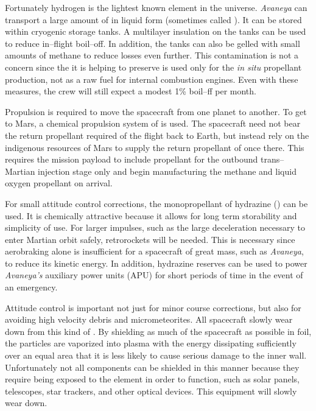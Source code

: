 Fortunately hydrogen is the lightest known element in the universe. {\it Avaneya} can transport a large amount of  in liquid form (sometimes called ). It can be stored within cryogenic storage tanks. A multilayer insulation on the tanks can be used to reduce in--flight boil--off. In addition, the tanks can also be gelled with small amounts of methane to reduce losses even further. This  contamination is not a concern since the  it is helping to preserve is used only for the {\it in situ} propellant production, not as a raw fuel for internal combustion engines. Even with these measures, the crew will still expect a modest 1\% boil--ff per month.

Propulsion is required to move the spacecraft from one planet to another. To get to Mars, a chemical propulsion system of  is used. The spacecraft need not bear the return propellant required of the flight back to Earth, but instead rely on the indigenous resources of Mars to supply the return propellant of  once there. This requires the mission payload to include propellant for the outbound trans--Martian injection stage only and begin manufacturing the methane and liquid oxygen propellant on arrival. 

For small attitude control corrections, the monopropellant of hydrazine () can be used. It is chemically attractive because it allows for long term storability and simplicity of use. For larger impulses, such as the large deceleration necessary to enter Martian orbit safely, retrorockets will be needed. This is necessary since aerobraking alone is insufficient for a spacecraft of great mass, such as {\it Avaneya}, to reduce its kinetic energy. In addition, hydrazine reserves can be used to power {\it Avaneya's} auxiliary power units (APU) for short periods of time in the event of an emergency.

Attitude control is important not just for minor course corrections, but also for avoiding high velocity debris and micrometeorites. All spacecraft slowly wear down from this kind of . By shielding as much of the spacecraft as possible in foil, the particles are vaporized into plasma with the energy dissipating sufficiently over an equal area that it is less likely to cause serious damage to the inner wall. Unfortunately not all components can be shielded in this manner because they require being exposed to the element in order to function, such as solar panels, telescopes, star trackers, and other optical devices. This equipment will slowly wear down.

